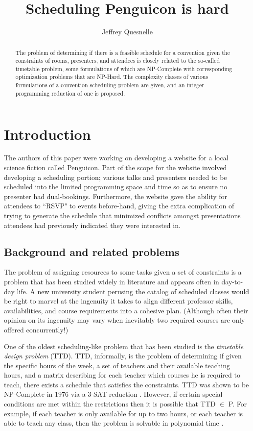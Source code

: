 \documentclass[]{article}
\title{Scheduling Penguicon is hard}
\author{Jeffrey Quesnelle}
\theoremstyle{definition}
\theoremstyle{remark}
\numberwithin{equation}{section}
\begin{document}
\maketitle

\begin{abstract}
The problem of determining if there is a feasible schedule for a convention given the constraints of rooms, presenters, and attendees is closely related to the so-called timetable problem, some formulations of which are NP-Complete with corresponding optimization problems that are NP-Hard. The complexity classes of various formulations of a convention scheduling problem are given, and an integer programming reduction of one is proposed.
\end{abstract}

\section{Introduction}

The authors of this paper were working on developing a website for a local science fiction called Penguicon. Part of the scope for the website involved developing a scheduling portion; various talks and presenters needed to be scheduled into the limited programming space and time so as to ensure no presenter had dual-bookings. Furthermore, the website gave the ability for attendees to ``RSVP" to events before-hand, giving the extra complication of trying to generate the schedule that minimized conflicts amongst presentations attendees had previously indicated they were interested in.

\subsection{Background and related problems}
The problem of assigning resources to some tasks given a set of constraints is a problem that has been studied widely in literature and appears often in day-to-day life. A new university student perusing the catalog of scheduled classes would be right to marvel at the ingenuity it takes to align different professor skills, availabilities, and course requirements into a cohesive plan. (Although often their opinion on its ingenuity may vary when inevitably two required courses are only offered concurrently!)  

One of the oldest scheduling-like problem that has been studied is the \emph{timetable design problem} (TTD). TTD, informally, is the problem of determining if given the specific hours of the week, a set of teachers and their available teaching hours, and a matrix describing for each teacher which courses he is required to teach, there exists a schedule that satisfies the constraints. TTD was shown to be NP-Complete in 1976 via a 3-SAT reduction \cite{even76}. However, if certain special conditions are met within the restrictions then it is possible that TTD $\in$ P. For example, if each teacher is only available for up to two hours, or each teacher is able to teach any class, then the problem is solvable in polynomial time \cite{garey76}.
\end{document}
